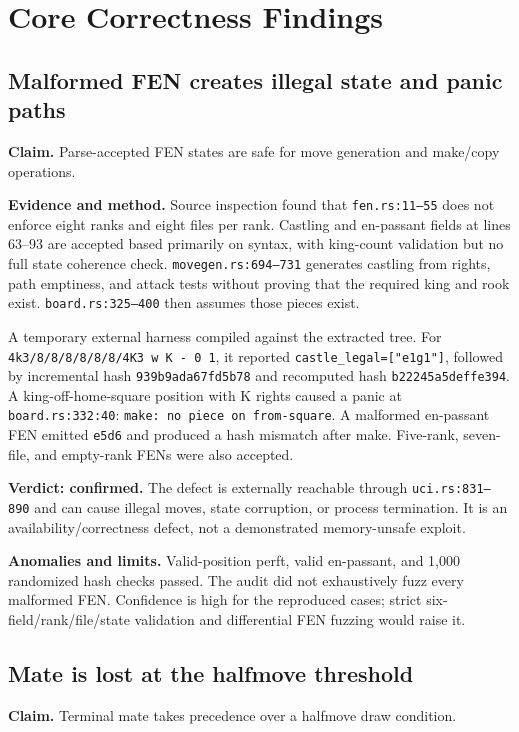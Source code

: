 \documentclass[conference]{IEEEtran}
\newcommand{\code}[1]{\texttt{\small #1}}
\begin{document}
\section{Core Correctness Findings}
\subsection{Malformed FEN creates illegal state and panic paths}
\textbf{Claim.} Parse-accepted FEN states are safe for move generation and make/copy operations.

\textbf{Evidence and method.} Source inspection found that \code{fen.rs:11--55} does not enforce eight ranks and eight files per rank. Castling and en-passant fields at lines 63--93 are accepted based primarily on syntax, with king-count validation but no full state coherence check. \code{movegen.rs:694--731} generates castling from rights, path emptiness, and attack tests without proving that the required king and rook exist. \code{board.rs:325--400} then assumes those pieces exist.

A temporary external harness compiled against the extracted tree. For \code{4k3/8/8/8/8/8/8/4K3 w K - 0 1}, it reported \code{castle\_legal=["e1g1"]}, followed by incremental hash \code{939b9ada67fd5b78} and recomputed hash \code{b22245a5deffe394}. A king-off-home-square position with K rights caused a panic at \code{board.rs:332:40}: \code{make: no piece on from-square}. A malformed en-passant FEN emitted \code{e5d6} and produced a hash mismatch after make. Five-rank, seven-file, and empty-rank FENs were also accepted.

\textbf{Verdict: confirmed.} The defect is externally reachable through \code{uci.rs:831--890} and can cause illegal moves, state corruption, or process termination. It is an availability/correctness defect, not a demonstrated memory-unsafe exploit.

\textbf{Anomalies and limits.} Valid-position perft, valid en-passant, and 1,000 randomized hash checks passed. The audit did not exhaustively fuzz every malformed FEN. Confidence is high for the reproduced cases; strict six-field/rank/file/state validation and differential FEN fuzzing would raise it.

\subsection{Mate is lost at the halfmove threshold}
\textbf{Claim.} Terminal mate takes precedence over a halfmove draw condition.
\end{document}
